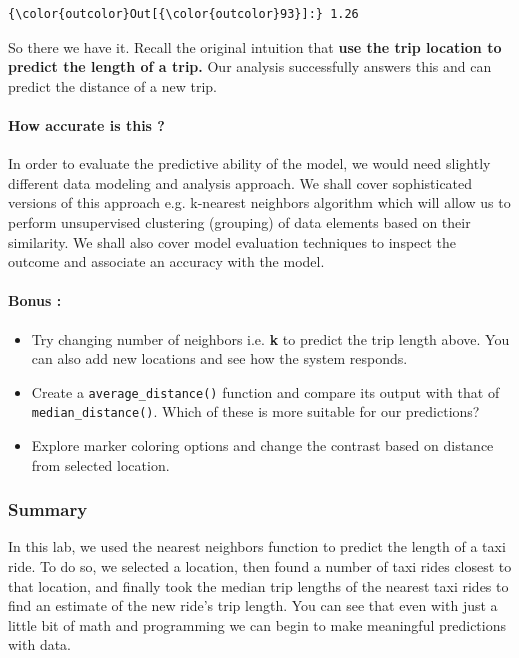 \documentclass[11pt]{article}
\providecommand{\tightlist}{%
      \setlength{\itemsep}{0pt}\setlength{\parskip}{0pt}}
\begin{document}
\begin{Verbatim}[commandchars=\\\{\}]
{\color{outcolor}Out[{\color{outcolor}93}]:} 1.26
\end{Verbatim}
            
    So there we have it. Recall the original intuition that \textbf{use the
trip location to predict the length of a trip.} Our analysis
successfully answers this and can predict the distance of a new trip.

\paragraph{How accurate is this ?}\label{how-accurate-is-this}

In order to evaluate the predictive ability of the model, we would need
slightly different data modeling and analysis approach. We shall cover
sophisticated versions of this approach e.g. k-nearest neighbors
algorithm which will allow us to perform unsupervised clustering
(grouping) of data elements based on their similarity. We shall also
cover model evaluation techniques to inspect the outcome and associate
an accuracy with the model.

    \paragraph{Bonus :}\label{bonus}

\begin{itemize}
\tightlist
\item
  Try changing number of neighbors i.e. \textbf{k} to predict the trip
  length above. You can also add new locations and see how the system
  responds.
\item
  Create a \texttt{average\_distance()} function and compare its output
  with that of \texttt{median\_distance()}. Which of these is more
  suitable for our predictions?
\item
  Explore marker coloring options and change the contrast based on
  distance from selected location.
\end{itemize}

    \subsubsection{Summary}\label{summary}

    In this lab, we used the nearest neighbors function to predict the
length of a taxi ride. To do so, we selected a location, then found a
number of taxi rides closest to that location, and finally took the
median trip lengths of the nearest taxi rides to find an estimate of the
new ride's trip length. You can see that even with just a little bit of
math and programming we can begin to make meaningful predictions with
data.


    
    
    
    
\end{document}
